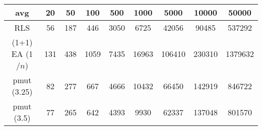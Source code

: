 \begin{tabular}[h]{ccccccccc}
avg&20&50&100&500&1000&5000&10000&50000\\\hline
RLS&56&187&446&3050&6725&42056&90485&537292\\
(1+1) EA (1$/n$)&131&438&1059&7435&16963&106410&230310&1379632\\
pmut (3.25)&82&277&667&4666&10432&66450&142919&846722\\
pmut (3.5)&77&265&642&4393&9930&62337&137048&801570\\
\end{tabular}
